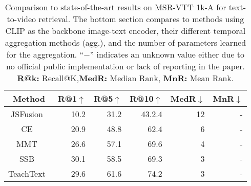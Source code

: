 \begin{table}[t]
\setlength{\tabcolsep}{5pt}
\scriptsize
\caption{\small{Comparison to state-of-the-art results on MSR-VTT 1k-A for text-to-video retrieval. The bottom section compares to methods using CLIP as the backbone image-text encoder, their different temporal aggregation methods (agg.), and the number of parameters learned for the aggregation. ``$-$'' indicates an unknown value either due to no official public implementation or lack of reporting in the paper. \textbf{R@k:} Recall@K,\textbf{MedR:} Median Rank, \textbf{MnR:} Mean Rank.}}
\centering
\begin{tabular}{@{}rccrrrrr@{}}
\toprule
\multicolumn{3}{c}{\textbf{Method}}        & \multicolumn{1}{c}{\textbf{R@1$\uparrow$}} & \multicolumn{1}{c}{\textbf{R@5$\uparrow$}} & \multicolumn{1}{c}{\textbf{R@10$\uparrow$}} & \multicolumn{1}{c}{\textbf{MedR$\downarrow$}} & \multicolumn{1}{c}{\textbf{MnR$\downarrow$}} \\ \midrule
\multicolumn{3}{c}{JSFusion~\cite{yu2018joint}}                                                                    & 10.2                             & 31.2                             & 43.2.4                              & 12                                &   -                               \\
\multicolumn{3}{c}{CE~\cite{Liu19a}}                                             & 20.9                             & 48.8                             & 62.4                              & 6                                 &   -                               \\
\multicolumn{3}{c}{MMT~\cite{gabeur2020multi}}                                                                    & 26.6                             & 57.1                             & 69.6                              & 4                                 &    -                              \\
\multicolumn{3}{c}{SSB~\cite{patrick2020support}}                                                                     & 30.1                             & 58.5                             & 69.3                              & 3                                 &  -                                \\
\multicolumn{3}{c}{TeachText~\cite{Croitoru21a}}                                                                     & 29.6                             & 61.6                             & 74.2                              & 3                                 &   -                               \\

\end{tabular}
\end{table}
